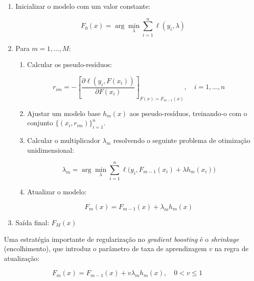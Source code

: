 \documentclass{article}
\begin{document}
\begin{enumerate}
    \item Inicializar o modelo com um valor constante:
    
    \begin{equation*}
        F_0(x) = \arg\min_{\lambda} \sum_{i=1}^{n} \ell(y_i,\lambda)
    \end{equation*}

    \item Para $m = 1, \dots, M$:

    \begin{enumerate}

    \item Calcular os pseudo-resíduos:

    \begin{equation*}
        r_{im} = -\left[\frac{\partial \ell(y_i, F(x_i))}{\partial F(x_i)}\right]_{F(x) = F_{m-1}(x)},\quad i = 1,\dots,n
    \end{equation*}

    \item Ajustar um modelo base $h_m(x)$ aos pseudo-resíduos, treinando-o
    com o conjunto $\{(x_i, r_{im})\}_{i=1}^{n}$.

    \item Calcular o multiplicador $\lambda_m$ resolvendo o seguinte 
    problema de otimização unidimensional:

    \begin{equation*}
        \lambda_m =\arg\min_{\lambda}\sum_{i=1}^{n}\ell\big(y_i, F_{m-1}(x_i) + \lambda h_m(x_i)\big)
    \end{equation*}

    \item Atualizar o modelo:

    \begin{equation*}
        F_m(x) = F_{m-1}(x) + \lambda_m h_m(x)
    \end{equation*}

    \end{enumerate}

    \item Saída final: $F_M(x)$
\end{enumerate}

Uma estratégia importante de regularização no \textit{gradient boosting}
é o \textit{shrinkage} (encolhimento), que introduz o parâmetro de taxa
de aprendizagem $v$ na regra de atualização:

\begin{equation}
    F_m(x) = F_{m-1}(x) + v \lambda_m h_m(x), \quad 0 < v \leq 1
\end{equation}
\end{document}
